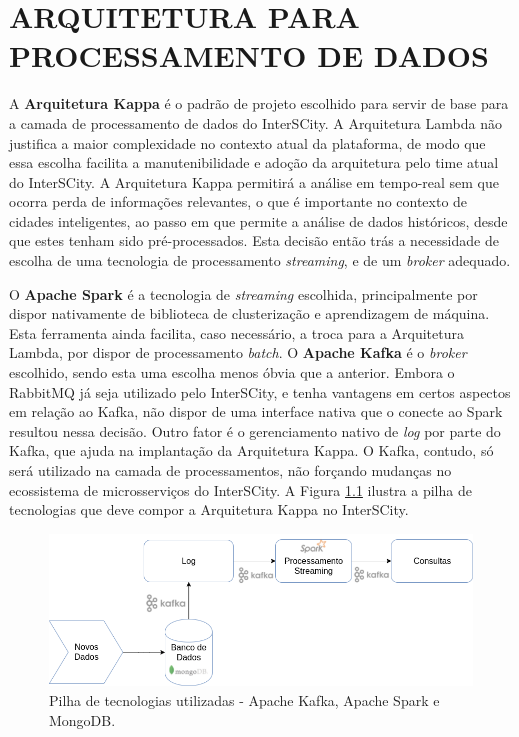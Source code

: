 \chapter[ARQUITETURA PARA PROCESSAMENTO DE DADOS]{ARQUITETURA PARA PROCESSAMENTO DE DADOS}
\label{chapter:architecture}

A \textbf{Arquitetura Kappa} é o padrão de projeto escolhido para servir de
base para a camada de processamento de dados do InterSCity. A Arquitetura
Lambda não justifica a maior complexidade no contexto atual da plataforma, de
modo que essa escolha facilita a manutenibilidade e adoção da arquitetura pelo
time atual do InterSCity. A Arquitetura Kappa permitirá a análise em tempo-real
sem que ocorra perda de informações relevantes, o que é importante no contexto de
cidades inteligentes, ao passo em que permite a análise de dados históricos,
desde que estes tenham sido pré-processados. Esta decisão então trás a
necessidade de escolha de uma tecnologia de processamento \textit{streaming},
e de um \textit{broker} adequado.

O \textbf{Apache Spark} é a tecnologia de \textit{streaming} escolhida,
principalmente por dispor nativamente de biblioteca de clusterização e
aprendizagem de máquina. Esta ferramenta ainda facilita, caso necessário, a
troca para a Arquitetura Lambda, por dispor de processamento \textit{batch}.
O \textbf{Apache Kafka} é o \textit{broker} escolhido, sendo esta uma escolha
menos óbvia que a anterior. Embora o RabbitMQ já seja utilizado pelo
InterSCity, e tenha vantagens em certos aspectos em relação ao Kafka, não
dispor de uma interface nativa que o conecte ao Spark resultou nessa decisão.
Outro fator é o gerenciamento nativo de \textit{log} por parte do
Kafka, que ajuda na implantação da Arquitetura Kappa. O Kafka, contudo, só
será utilizado na camada de processamentos, não forçando mudanças no
ecossistema de microsserviços do InterSCity. A Figura \ref{fig:stack} ilustra
a pilha de tecnologias que deve compor a Arquitetura Kappa no InterSCity.

\begin{figure}
  \centering
    \includegraphics[scale=0.5]{figuras/kappa_tools.png}
  \caption{Pilha de tecnologias utilizadas - Apache Kafka, Apache Spark e MongoDB.}
  \label{fig:stack}
\end{figure}


